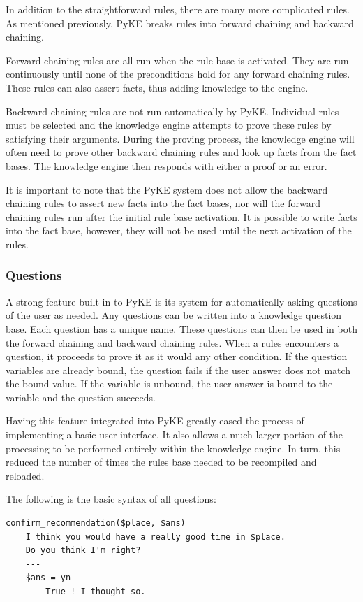 \documentclass[11pt]{article} %
\begin{document}
In addition to the straightforward rules, there are many more complicated rules. As mentioned previously, PyKE breaks rules into forward chaining and backward chaining.

Forward chaining rules are all run when the rule base is activated. They are run continuously until none of the preconditions hold for any forward chaining rules. These rules can also assert facts, thus adding knowledge to the engine.

Backward chaining rules are not run automatically by PyKE. Individual rules must be selected and the knowledge engine attempts to prove these rules by satisfying their arguments. During the proving process, the knowledge engine will often need to prove other backward chaining rules and look up facts from the fact bases. The knowledge engine then responds with either a proof or an error.

It is important to note that the PyKE system does not allow the backward chaining rules to assert new facts into the fact bases, nor will the forward chaining rules run after the initial rule base activation. It is possible to write facts into the fact base, however, they will not be used until the next activation of the rules.

\subsubsection{Questions}
A strong feature built-in to PyKE is its system for automatically asking questions of the user as needed. Any questions can be written into a knowledge question base. Each question has a unique name. These questions can then be used in both the forward chaining and backward chaining rules. When a rules encounters a question, it proceeds to prove it as it would any other condition. If the question variables are already bound, the question fails if the user answer does not match the bound value. If the variable is unbound, the user answer is bound to the variable and the question succeeds.

Having this feature integrated into PyKE greatly eased the process of implementing a basic user interface. It also allows a much larger portion of the processing to be performed entirely within the knowledge engine. In turn, this reduced the number of times the rules base needed to be recompiled and reloaded.

The following is the basic syntax of all questions:
\begin{Verbatim}[xleftmargin=2.5cm]
confirm_recommendation($place, $ans)
    I think you would have a really good time in $place.
    Do you think I'm right?
    ---
    $ans = yn
        True ! I thought so.
\end{Verbatim}
\end{document}
